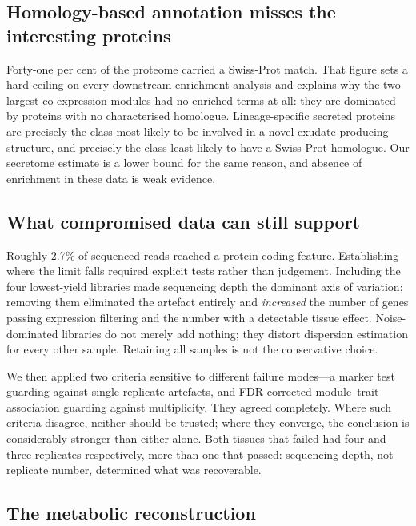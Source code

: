 \subsection{Homology-based annotation misses the interesting proteins}

Forty-one per cent of the proteome carried a Swiss-Prot match. That figure sets a hard ceiling
on every downstream enrichment analysis and explains why the two largest co-expression modules
had no enriched terms at all: they are dominated by proteins with no characterised homologue.
Lineage-specific secreted proteins are precisely the class most likely to be involved in a
novel exudate-producing structure, and precisely the class least likely to have a Swiss-Prot
homologue. Our secretome estimate is a lower bound for the same reason, and absence of
enrichment in these data is weak evidence.

\subsection{What compromised data can still support}

Roughly 2.7\% of sequenced reads reached a protein-coding feature. Establishing where the limit
falls required explicit tests rather than judgement. Including the four lowest-yield libraries
made sequencing depth the dominant axis of variation; removing them eliminated the artefact
entirely and \emph{increased} the number of genes passing expression filtering and the number
with a detectable tissue effect. Noise-dominated libraries do not merely add nothing; they
distort dispersion estimation for every other sample. Retaining all samples is not the
conservative choice.

We then applied two criteria sensitive to different failure modes---a marker test guarding
against single-replicate artefacts, and FDR-corrected module--trait association guarding
against multiplicity. They agreed completely. Where such criteria disagree, neither should be
trusted; where they converge, the conclusion is considerably stronger than either alone. Both
tissues that failed had four and three replicates respectively, more than one that passed:
sequencing depth, not replicate number, determined what was recoverable.

\subsection{The metabolic reconstruction}

